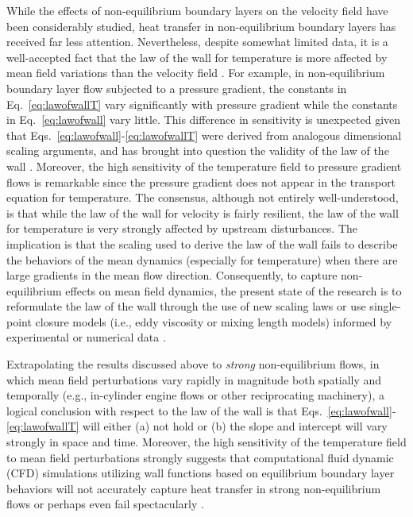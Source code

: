 While the effects of non-equilibrium boundary layers on the velocity field have been considerably studied, heat transfer in non-equilibrium boundary layers has received far less attention. Nevertheless, despite somewhat limited data, it is a well-accepted fact that the law of the wall for temperature is more affected by mean field variations than the velocity field \cite{Blackwell_1972, Kader1991, Bradshaw1995, Kong2001, Houra2006, Wang2008}. For example, in non-equilibrium boundary layer flow subjected to a pressure gradient, the constants in Eq.~\ref{eq:lawofwallT} vary significantly with pressure gradient while the constants in Eq.~\ref{eq:lawofwall} vary little. This difference in sensitivity is unexpected given that Eqs.~\ref{eq:lawofwall}-\ref{eq:lawofwallT} were derived from analogous dimensional scaling arguments, and has brought into question the validity of the law of the wall \cite{Bradshaw1995}. Moreover, the high sensitivity of the temperature field to pressure gradient flows is remarkable since the pressure gradient does not appear in the transport equation for temperature. 
The consensus, although not entirely well-understood, is that while the law of the wall for velocity is fairly resilient, the law of the wall for temperature is very strongly affected by upstream disturbances. The implication is that the scaling used to derive the law of the wall fails to describe the behaviors of the mean dynamics (especially for temperature) when there are large gradients in the mean flow direction. Consequently, to capture non-equilibrium effects on mean field dynamics, the present state of the research is to reformulate the law of the wall through the use of new scaling laws \cite{Durbin1992, George1993, Cruz1998, Cruz2002, Wang2008} or use single-point closure models (i.e., eddy viscosity or mixing length models) informed by experimental or numerical data \cite{Cebeci1988}.

Extrapolating the results discussed above to \emph{strong} non-equilibrium flows, in which mean field perturbations vary rapidly in magnitude both spatially and temporally (e.g., in-cylinder engine flows or other reciprocating machinery), a logical conclusion with respect to the law of the wall is that Eqs.~\ref{eq:lawofwall}-\ref{eq:lawofwallT} will either (a) not hold or (b) the slope and intercept will vary strongly in space and time. Moreover, the high sensitivity of the temperature field to mean field perturbations strongly suggests that computational fluid dynamic (CFD) simulations utilizing wall functions based on equilibrium boundary layer behaviors will not accurately capture heat transfer in strong non-equilibrium flows or perhaps even fail spectacularly \cite{Launder1988}. 

